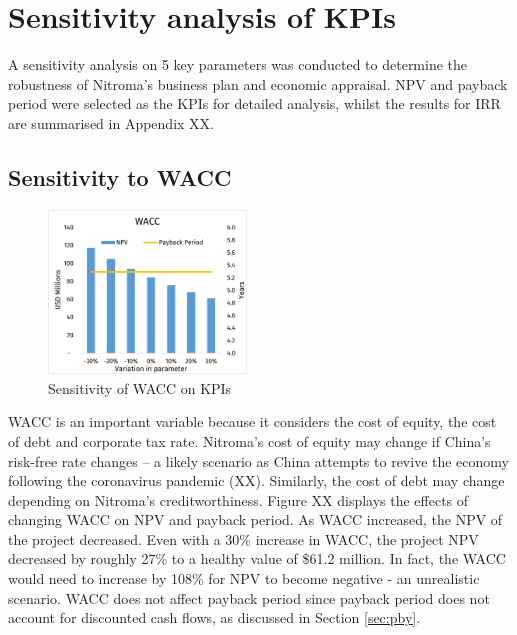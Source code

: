 \section{Sensitivity analysis of KPIs}
A sensitivity analysis on 5 key parameters was conducted to determine the robustness of Nitroma’s business plan and economic appraisal. NPV and payback period were selected as the KPIs for detailed analysis, whilst the results for IRR are summarised in Appendix XX. 

\subsection{Sensitivity to WACC}
\begin{figure}
    \caption{Sensitivity of WACC on KPIs}
    \label{Sensitivity_WACC}
    \includegraphics[width=0.47\textwidth]{chapters/6-economics/figures/Sensitivity_WACC.jpg}
\end{figure}
WACC is an important variable because it considers the cost of equity, the cost of debt and corporate tax rate. Nitroma’s cost of equity may change if China’s risk-free rate changes – a likely scenario as China attempts to revive the economy following the coronavirus pandemic (XX). Similarly, the cost of debt may change depending on Nitroma’s creditworthiness.  Figure XX displays the effects of changing WACC on NPV and payback period. As WACC increased, the NPV of the project decreased. Even with a 30\% increase in WACC, the project NPV decreased by roughly 27\% to a healthy value of \$61.2 million. In fact, the WACC would need to increase by 108\% for NPV to become negative - an unrealistic scenario. WACC does not affect payback period since payback period does not account for discounted cash flows, as discussed in Section \ref{sec:pby}. 


